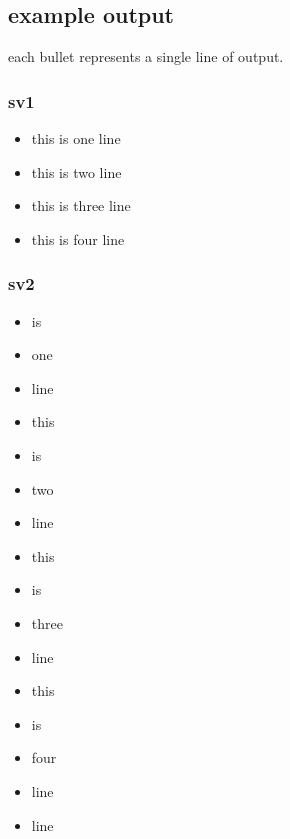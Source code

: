 \documentclass[11pt]{article}
\begin{document}
\subsection{example output}
\label{sec:org269fe74}
each bullet represents a single line of output.
\subsubsection{sv1}
\label{sec:org21d9582}
\begin{itemize}
\item this is one line
\item this is two line
\item this is three line
\item this is four line
\end{itemize}
\subsubsection{sv2}
\label{sec:orge9a0130}
\begin{itemize}
\item is
\item one
\item line
\item this
\item is
\item two
\item line
\item this
\item is
\item three
\item line
\item this
\item is
\item four
\item line
\item line
\end{itemize}
\end{document}
